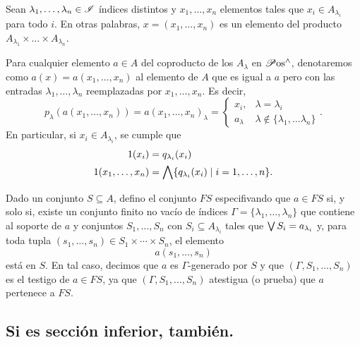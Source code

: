 \begin{definition}
Sean $\lambda_1,\dots,\lambda_n\in \mathscr{I}$ índices distintos y
$x_1,\dots,x_n$ elementos tales que
$x_i\in A_{\lambda_i}$ para todo $i$.
En otras palabras, $x=(x_1,\dots,x_n)$ es un elemento del producto
$A_{\lambda_1}\times\dots\times A_{\lambda_n}$.

Para cualquier elemento $a\in A$ del coproducto de los $A_\lambda$
en $\mathscr{P}\mathrm{os}^{\wedge}$, denotaremos como
$a(x)=a(x_1,\dots,x_n)$ al elemento de $A$ que
es igual a $a$ pero con las entradas $\lambda_1,\dots,\lambda_n$
reemplazadas por $x_1,\dots,x_n$.
Es decir,
\[
    p_\lambda(a(x_1,\dots,x_n))
    =
    a(x_1,\dots,x_n)_\lambda
    =
    \begin{cases}
        x_i, & \lambda = \lambda_i \\
        a_\lambda & \lambda\not\in\{\lambda_1,\dots\lambda_n\}
    \end{cases}
.\]
En particular, si $x_i\in A_{\lambda_i}$, se cumple que
\begin{align*}
  1(x_i)
    &= q_{\lambda_i}(x_i) \\
  1(x_1,\dots,x_n)
    &= \bigwedge\{q_{\lambda_i}(x_i) \mid i=1,\dots,n\}.
\end{align*}
%
\end{definition}

\begin{definition}
  Dado un conjunto $S\subseteq A$, defino el conjunto $FS$
  especifivando que $a\in FS$ si, y solo si,
  existe un conjunto finito no vacío de índices
  $\Gamma=\{\lambda_1,\dots,\lambda_n\}$ que contiene al
  soporte de $a$ y conjuntos $S_1,\dots,S_n$ con
  $S_i\subseteq A_{\lambda_i}$ tales que $\bigvee S_i =
  a_{\lambda_i}$ y, para toda tupla
  $(s_1,\dots,s_n)\in S_1\times\cdots\times S_n$, el elemento
  \[
    a(s_1,\dots,s_n)
  \]
  está en $S$.
  En tal caso, decimos que $a$ es $\Gamma$-generado por $S$ y
  que $(\Gamma,S_1,\dots,S_n)$ es el testigo de $a\in FS$,
  ya que $(\Gamma,S_1,\dots,S_n)$ atestigua (o prueba) que
  $a$ pertenece a $FS$.
\end{definition}

\subsection{Si  es sección inferior,  también.}

